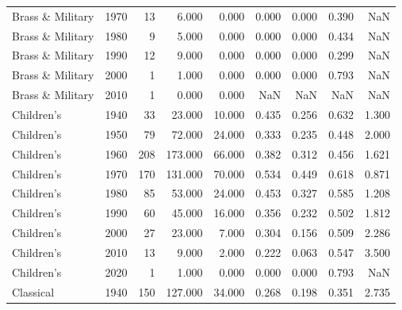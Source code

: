 \begin{table}
{\begin{tabular}{lrrrrrrrr}
      Brass \& Military &           1970 &         13 &    6.000 &    0.000 &        0.000 &  0.000 &  0.390 &                    NaN \\
      Brass \& Military &           1980 &          9 &    5.000 &    0.000 &        0.000 &  0.000 &  0.434 &                    NaN \\
      Brass \& Military &           1990 &         12 &    9.000 &    0.000 &        0.000 &  0.000 &  0.299 &                    NaN \\
      Brass \& Military &           2000 &          1 &    1.000 &    0.000 &        0.000 &  0.000 &  0.793 &                    NaN \\
      Brass \& Military &           2010 &          1 &    0.000 &    0.000 &          NaN &    NaN &    NaN &                    NaN \\
            Children's &           1940 &         33 &   23.000 &   10.000 &        0.435 &  0.256 &  0.632 &                  1.300 \\
            Children's &           1950 &         79 &   72.000 &   24.000 &        0.333 &  0.235 &  0.448 &                  2.000 \\
            Children's &           1960 &        208 &  173.000 &   66.000 &        0.382 &  0.312 &  0.456 &                  1.621 \\
            Children's &           1970 &        170 &  131.000 &   70.000 &        0.534 &  0.449 &  0.618 &                  0.871 \\
            Children's &           1980 &         85 &   53.000 &   24.000 &        0.453 &  0.327 &  0.585 &                  1.208 \\
            Children's &           1990 &         60 &   45.000 &   16.000 &        0.356 &  0.232 &  0.502 &                  1.812 \\
            Children's &           2000 &         27 &   23.000 &    7.000 &        0.304 &  0.156 &  0.509 &                  2.286 \\
            Children's &           2010 &         13 &    9.000 &    2.000 &        0.222 &  0.063 &  0.547 &                  3.500 \\
            Children's &           2020 &          1 &    1.000 &    0.000 &        0.000 &  0.000 &  0.793 &                    NaN \\
             Classical &           1940 &        150 &  127.000 &   34.000 &        0.268 &  0.198 &  0.351 &                  2.735 \\

\end{tabular}}
\end{table}
